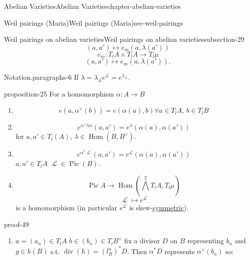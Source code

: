 \documentclass[oneside,10pt,]{book}
\numberwithin{equation}{section}
\newcommand{\sheaf}[1]{\operatorname{\mathcal{#1}}}
\DeclareMathOperator{\Hom}{Hom}
\DeclareMathOperator{\divisor}{div}
\DeclareMathOperator{\Pic}{Pic}
\begin{document}
\begin{chapterptx}{Abelian Varieties}{}{Abelian Varieties}{}{}{chapter-abelian-varieties}
\begin{sectionptx}{Weil pairings (Maria)}{}{Weil pairings (Maria)}{}{}{sec-weil-pairings}
\begin{subsectionptx}{Weil pairings on abelian varieties}{}{Weil pairings on abelian varieties}{}{}{subsection-29}
\begin{equation*}
(a,a') \mapsto e_m(a, \lambda(a'))
\end{equation*}
%
\begin{equation*}
e_m \colon T_lA\times T_l A \to T_l \mu
\end{equation*}
%
\begin{equation*}
(a,a') \mapsto e_m(a, \lambda(a'))\text{.}
\end{equation*}
%
\begin{paragraphs}{Notation.}{paragraphs-6}%
\hypertarget{p-305}{}%
If \(\lambda = \lambda_{\sheaf L} e^{\sheaf L} = e^{\lambda_{\sheaf L}}\).%
\end{paragraphs}%
\begin{proposition}{}{}{proposition-25}%
\hypertarget{p-306}{}%
For a homomorphism \(\alpha \colon A \to B\)\leavevmode%
\begin{enumerate}
\item\hypertarget{li-48}{}%
\begin{equation*}
e(a,\alpha^\vee(b)) = e(\alpha (a), b) \forall a \in T_lA,\,b\in T_l B
\end{equation*}
%
\item\hypertarget{li-49}{}%
\begin{equation*}
e^{\alpha^\vee \lambda \alpha}(a,a') = e ^\lambda (\alpha(a), \alpha(a'))
\end{equation*}
for \(a,a' \in T_l(A)\), \(\lambda \in \Hom(B,B^\vee)\).%
\item\hypertarget{li-50}{}%
\begin{equation*}
e^{\alpha^* \sheaf L} (a,a') = e^{\sheaf L}(\alpha (a),\alpha(a'))
\end{equation*}
\(a,a'\in T_lA\) \(\sheaf L\in \Pic(B)\).%
\item\hypertarget{li-51}{}%
\begin{equation*}
\Pic A  \to \Hom( \bigwedge^2 T_lA , T_l\mu)
\end{equation*}
%
\begin{equation*}
\sheaf L \mapsto e^{\sheaf L}
\end{equation*}
is a homomorphism (in particular \(e^{\sheaf L}\) is  skew-\hyperref[def-princ-pol]{symmetric}).%
\end{enumerate}
%
\end{proposition}
\begin{proofptx}{}{proof-49}
\hypertarget{p-307}{}%
\leavevmode%
\begin{enumerate}
\item\hypertarget{li-52}{}\(a = (a_n) \in T_lA\) \(b\in (b_n) \in T_l B^\vee\) fix a divisor \(D \) on \(B\) representing \(b_n\) and \(g\in k(B)\) s.t. \(\divisor (h) = (l^n_B)^* D\). Then \(\alpha^* D\) represents \(\alpha^\vee(b_n)\) so:%

\end{enumerate}
\end{proofptx}
\end{subsectionptx}
\end{sectionptx}
\end{chapterptx}
\end{document}
